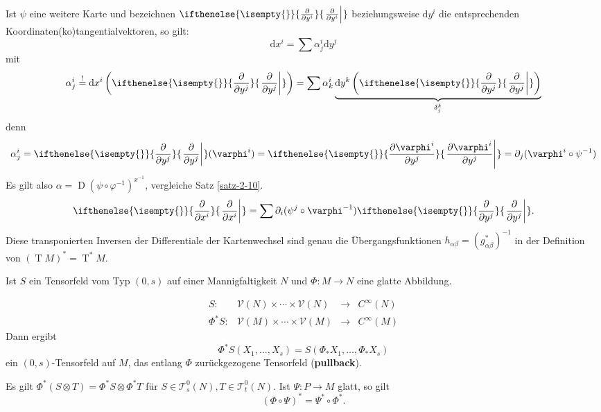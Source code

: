 \documentclass[paper=A4, twoside, chapterprefix=true, bibliography=totoc, headsepline]{scrbook}
\let\temp\phi{}
\let\phi\varphi{}
\let\varphi\temp{}
\let\temp\theta{}
\let\theta\vartheta{}
\let\vartheta\temp{}
\let\temp\epsilon{}
\let\epsilon\varepsilon{}
\let\varepsilon\temp{}
\let\temp\rho{}
\let\rho\varrho{}
\let\varrho\temp{}
\DeclareMathOperator{\calT}{\mathcal{T}}
\DeclareMathOperator{\D}{D}         %
\DeclareMathOperator{\T}{T}         %
\newcommand{\dop}{\mathrm{d}}
\newcommand{\X}{\times}
\newcommand{\pdifffrac}[3][]{\ifthenelse{\isempty{#1}}{\frac{\partial #2}{\partial #3}}{\left. \frac{\partial #2}{\partial #3} \right|_{#1}}}
\theoremstyle{plain}
\theoremstyle{nonumberplain}
\theoremstyle{empty}
\theoremstyle{break}
\newcommand{\CmIndex}[2][]{\ifthenelse{\isempty{#1}}{\index{#2}}{\index{#1}}#2}
\newcommand{\CmMark}[2][]{\textbf{\CmIndex[#1]{#2}}}
\begin{document}
Ist $\psi$ eine weitere Karte und bezeichnen $\pdifffrac{}{y^i}$ beziehungsweise $\dop y^i$ die entsprechenden Koordinaten(ko)tangentialvektoren, so gilt:
	\[ \dop x^i = \sum \alpha_j^i\dop y^j \]
mit
	\[ \alpha_j^i \overset{!}{=} \dop x^i\left(\pdifffrac{}{y^j}\right) = \sum \alpha_k^i \underbrace{\dop y^k\left(\pdifffrac{}{y^j}\right)}_{\delta_j^k} \]
denn
	\[ \alpha_j^i = \pdifffrac{}{y^j}(\phi^i) = \pdifffrac{\phi^i}{y^j} = \partial_j(\phi^i\circ \psi^{-1}) \]
Es gilt also $\alpha = \D(\psi \circ \phi^{-1})^{x^{-1}}$, vergleiche Satz \ref{satz-2-10}.
\begin{align*}
  \pdifffrac{}{x^i} = \sum \partial_i (\psi^j \circ \phi^{-1})\pdifffrac{}{y^j}.
\end{align*}
Diese transponierten Inversen der Differentiale der Kartenwechsel sind genau die \"Ubergangsfunktionen $h_{\alpha\beta} = (g_{\alpha\beta}^{*})^{-1}$ in der Definition von $(\T M)^{*} = \T^{*}M$.

Ist $S$ ein Tensorfeld vom Typ $(0,s)$ auf einer Mannigfaltigkeit $N$ und $\Phi \colon M \to N$ eine glatte Abbildung.
\begin{center}\end{center}
	\[ \begin{array}{rccc} S \colon & \mathcal V(N) \X \cdots \X \mathcal V(N) &\to& C^{\infty}(N)\\
		\Phi^{*}S \colon & \mathcal V(M) \X \cdots \X \mathcal V(M) &\to& C^{\infty}(M) \end{array} \]
Dann ergibt
	\[ \Phi^{*}S(X_{1},\ldots,X_{s}) = S(\Phi_{*}X_{1},\ldots,\Phi_{*}X_{s}) \]
ein $(0,s)$-Tensorfeld auf $M$, das entlang $\Phi$ zur\"uckgezogene Tensorfeld (\CmMark{pullback}).

Es gilt $\Phi^{*}(S \otimes T) = \Phi^{*}S \otimes \Phi^{*}T$ f\"ur $S \in \mathcal T_s^0(N), T \in \mathcal T_t^0(N)$.
Ist $\Psi \colon P \to M$ glatt, so gilt
	\[ (\Phi \circ \Psi)^{*} = \Psi^{*} \circ \Phi^{*}.\]
\end{document}
